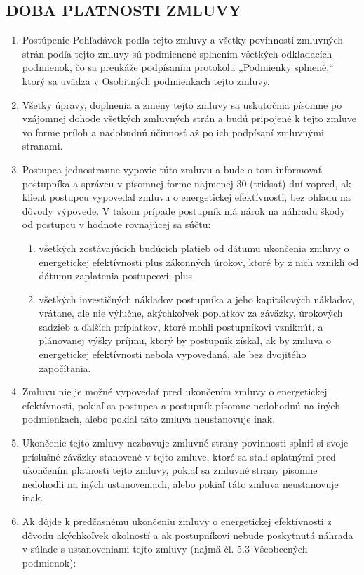 \documentclass[a4paper]{article}
\begin{document}
\begin{multicols}{2}
\subsection{DOBA PLATNOSTI ZMLUVY}
    \begin{enumerate}
    \item	Postúpenie Pohľadávok podľa tejto zmluvy a všetky povinnosti zmluvných strán podľa tejto zmluvy sú podmienené splnením všetkých odkladacích podmienok, čo sa preukáže podpísaním protokolu „Podmienky splnené,“ ktorý sa uvádza v Osobitných podmienkach tejto zmluvy.
    \item	Všetky úpravy, doplnenia a zmeny tejto zmluvy sa uskutočnia písomne po vzájomnej dohode všetkých zmluvných strán a budú pripojené k tejto zmluve vo forme príloh a nadobudnú účinnosť až po ich podpísaní zmluvnými stranami.
    \item	Postupca jednostranne vypovie túto zmluvu a bude o tom informovať postupníka a správcu v písomnej forme najmenej 30 (tridsať) dní vopred, ak klient postupcu vypovedal zmluvu o energetickej efektívnosti, bez ohľadu na dôvody výpovede. V takom prípade postupník má nárok na náhradu škody od postupcu v hodnote rovnajúcej sa súčtu: 
    \begin{enumerate}
    \item{všetkých zostávajúcich budúcich platieb od dátumu ukončenia zmluvy o energetickej efektívnosti plus zákonných úrokov, ktoré by z nich vznikli od dátumu zaplatenia postupcovi; plus}
    \item{všetkých investičných nákladov postupníka a jeho kapitálových nákladov, vrátane, ale nie výlučne, akýchkoľvek poplatkov za záväzky, úrokových sadzieb a ďalších príplatkov, ktoré mohli postupníkovi vzniknúť, a plánovanej výšky príjmu, ktorý by postupník získal, ak by zmluva o energetickej efektívnosti nebola vypovedaná, ale bez dvojitého započítania.}
    \end{enumerate}
\item	Zmluvu nie je možné vypovedať pred ukončením zmluvy o energetickej efektívnosti, pokiaľ sa postupca a postupník písomne nedohodnú na iných podmienkach, alebo pokiaľ táto zmluva neustanovuje inak.  
\item	Ukončenie tejto zmluvy nezbavuje zmluvné strany povinnosti splniť si svoje príslušné záväzky stanovené v tejto zmluve, ktoré sa stali splatnými pred ukončením platnosti tejto zmluvy, pokiaľ sa zmluvné strany písomne nedohodli na iných ustanoveniach, alebo pokiaľ táto zmluva neustanovuje inak. 
\item	Ak dôjde k predčasnému ukončeniu zmluvy o energetickej efektívnosti z dôvodu akýchkoľvek okolností a ak postupníkovi nebude poskytnutá náhrada v súlade s ustanoveniami tejto zmluvy (najmä čl. 5.3 Všeobecných podmienok):

\end{enumerate}
\end{multicols}
\end{document}
